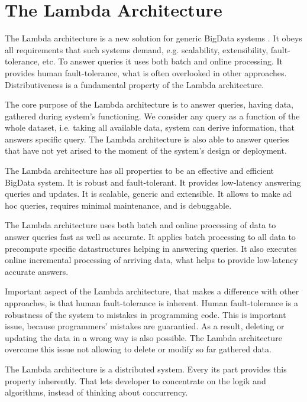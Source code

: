 \chapter{The Lambda Architecture}
\label{chap:lambda_architecture}

The Lambda architecture is a new solution for generic BigData systems \cite{MarzWarren201401}.
It obeys all requirements that such systems demand, e.g. scalability, extensibility, fault-tolerance, etc.
To answer queries it uses both batch and online processing.
It provides human fault-tolerance, what is often overlooked in other approaches.
Distributiveness is a fundamental property of the Lambda architecture.

The core purpose of the Lambda architecture is to answer queries, having data, gathered during system's functioning.
We consider any query as a function of the whole dataset, i.e. taking all available data, system can derive information, that answers specific query.
The Lambda architecture is also able to answer queries that have not yet arised to the moment of the system's design or deployment.

The Lambda architecture has all properties to be an effective and efficient BigData system.
It is robust and fault-tolerant.
It provides low-latency answering queries and updates.
It is scalable, generic and extensible.
It allows to make ad hoc queries, requires minimal maintenance, and is debuggable.

The Lambda architecture uses both batch and online processing of data to answer queries fast as well as accurate.
It applies batch processing to all data to precompute specific datastructures helping in answering queries.
It also executes online incremental processing of arriving data, what helps to provide low-latency accurate answers.

Important aspect of the Lambda architecture, that makes a difference with other approaches, is that human fault-tolerance is inherent.
Human fault-tolerance is a robustness of the system to mistakes in programming code.
This is important issue, because programmers' mistakes are guarantied.
As a result, deleting or updating the data in a wrong way is also possible.
The Lambda architecture overcome this issue not allowing to delete or modify so far gathered data.

The Lambda architecture is a distributed system.
Every its part provides this property inherently.
That lets developer to concentrate on the logik and algorithms, instead of thinking about concurrency.




